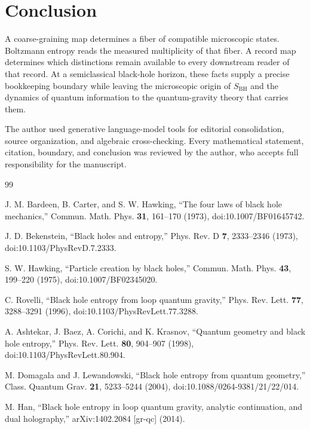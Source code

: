 \documentclass[aps,prd,reprint,nofootinbib,superscriptaddress]{revtex4-2}
\newcommand{\BH}{\mathrm{BH}}
\begin{document}
\section{Conclusion}

A coarse-graining map determines a fiber of compatible microscopic states. Boltzmann entropy reads the measured multiplicity of that fiber. A record map determines which distinctions remain available to every downstream reader of that record. At a semiclassical black-hole horizon, these facts supply a precise bookkeeping boundary while leaving the microscopic origin of $S_{\BH}$ and the dynamics of quantum information to the quantum-gravity theory that carries them.

\begin{acknowledgments}
The author used generative language-model tools for editorial consolidation, source organization, and algebraic cross-checking. Every mathematical statement, citation, boundary, and conclusion was reviewed by the author, who accepts full responsibility for the manuscript.
\end{acknowledgments}

\begin{thebibliography}{99}

J. M. Bardeen, B. Carter, and S. W. Hawking,
``The four laws of black hole mechanics,''
Commun. Math. Phys. \textbf{31}, 161--170 (1973),
doi:10.1007/BF01645742.

J. D. Bekenstein,
``Black holes and entropy,''
Phys. Rev. D \textbf{7}, 2333--2346 (1973),
doi:10.1103/PhysRevD.7.2333.

S. W. Hawking,
``Particle creation by black holes,''
Commun. Math. Phys. \textbf{43}, 199--220 (1975),
doi:10.1007/BF02345020.

C. Rovelli,
``Black hole entropy from loop quantum gravity,''
Phys. Rev. Lett. \textbf{77}, 3288--3291 (1996),
doi:10.1103/PhysRevLett.77.3288.

A. Ashtekar, J. Baez, A. Corichi, and K. Krasnov,
``Quantum geometry and black hole entropy,''
Phys. Rev. Lett. \textbf{80}, 904--907 (1998),
doi:10.1103/PhysRevLett.80.904.

M. Domagala and J. Lewandowski,
``Black hole entropy from quantum geometry,''
Class. Quantum Grav. \textbf{21}, 5233--5244 (2004),
doi:10.1088/0264-9381/21/22/014.

M. Han,
``Black hole entropy in loop quantum gravity, analytic continuation, and dual holography,''
arXiv:1402.2084 [gr-qc] (2014).

\end{thebibliography}
\end{document}
